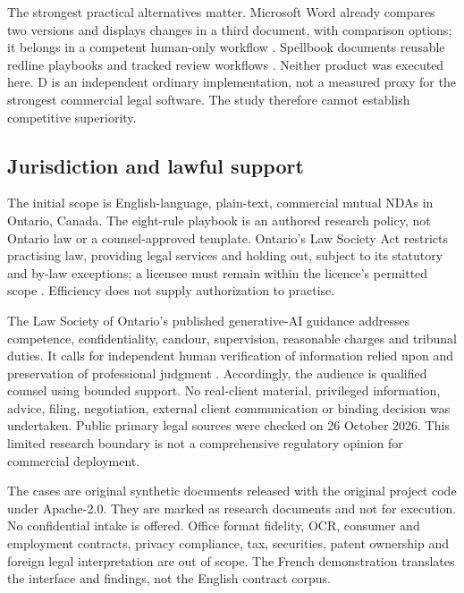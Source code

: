 \documentclass[10pt,a4paper]{article}
\begin{document}
The strongest practical alternatives matter. Microsoft Word already compares two versions and displays changes in a third document, with comparison options; it belongs in a competent human-only workflow \cite{word}. Spellbook documents reusable redline playbooks and tracked review workflows \cite{spellbook}. Neither product was executed here. D is an independent ordinary implementation, not a measured proxy for the strongest commercial legal software. The study therefore cannot establish competitive superiority.

\subsection{Jurisdiction and lawful support}
The initial scope is English-language, plain-text, commercial mutual NDAs in Ontario, Canada. The eight-rule playbook is an authored research policy, not Ontario law or a counsel-approved template. Ontario's Law Society Act restricts practising law, providing legal services and holding out, subject to its statutory and by-law exceptions; a licensee must remain within the licence's permitted scope \cite{lsa}. Efficiency does not supply authorization to practise.

The Law Society of Ontario's published generative-AI guidance addresses competence, confidentiality, candour, supervision, reasonable charges and tribunal duties. It calls for independent human verification of information relied upon and preservation of professional judgment \cite{lso}. Accordingly, the audience is qualified counsel using bounded support. No real-client material, privileged information, advice, filing, negotiation, external client communication or binding decision was undertaken. Public primary legal sources were checked on 26 October 2026. This limited research boundary is not a comprehensive regulatory opinion for commercial deployment.

The cases are original synthetic documents released with the original project code under Apache-2.0. They are marked as research documents and not for execution. No confidential intake is offered. Office format fidelity, OCR, consumer and employment contracts, privacy compliance, tax, securities, patent ownership and foreign legal interpretation are out of scope. The French demonstration translates the interface and findings, not the English contract corpus.
\end{document}
